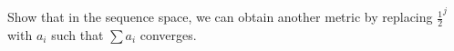 Show that in the sequence space, we can obtain another metric by replacing $\frac12^j$ with $a_i$ such
that $\sum a_i$ converges.\\